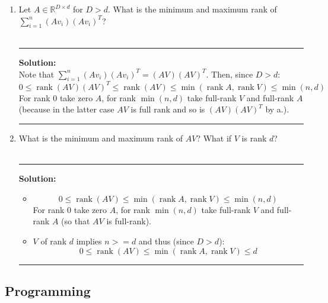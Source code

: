 \documentclass{article}
\newcommand{\1}{\mathbf{1}}
\DeclareMathOperator{\rank}{rank}
\begin{document}
\begin{enumerate}
            \noindent\rule{\textwidth}{1pt}
        \item Let $A \in \mathbb{R}^{D \times d}$ for $D > d$. What is the minimum and maximum rank of $\sum_{i=1}^n (A v_i) (A v_i)^T$?
        \\
        \\
            \noindent\rule{\textwidth}{1pt}
            {\bf Solution:}\\
            Note that $\sum_{i=1}^n (A v_i) (A v_i)^T = (AV)(AV)^T$. Then, since $D>d$:
            $$
            \boxed{ 0 \le \rank(AV)(AV)^T \le \rank(AV) \le \min(\rank A, \rank V) \le \min(n,d)}
            $$
            For rank 0 take zero $A$, for rank $\min(n,d)$ take full-rank $V$ and full-rank $A$ (because in the latter case $AV$ is full rank and so is $(AV)(AV)^T$ by a.).
        
            \noindent\rule{\textwidth}{1pt}
        \item What is the minimum and maximum rank of $AV$? What if $V$ is rank $d$?
        \\
        \\
            \noindent\rule{\textwidth}{1pt}
            {\bf Solution:}\\
            \begin{itemize}
            \item
            $$
            \boxed{ 0 \le \rank(AV) \le \min(\rank A, \rank V) \le \min(n,d)}
            $$
            For rank 0 take zero $A$, for rank $\min(n,d)$ take full-rank $V$ and full-rank $A$ (so that $AV$ is full-rank).
            \item $V$ of rank $d$ implies $n>=d$ and thus (since $D>d$):
            $$
            \boxed{ 0 \le \rank(AV) \le \min(\rank A, \rank V) \le d}
            $$
            \end{itemize}
        
            \noindent\rule{\textwidth}{1pt}
    \end{enumerate}

\subsection*{Programming}
\end{document}
